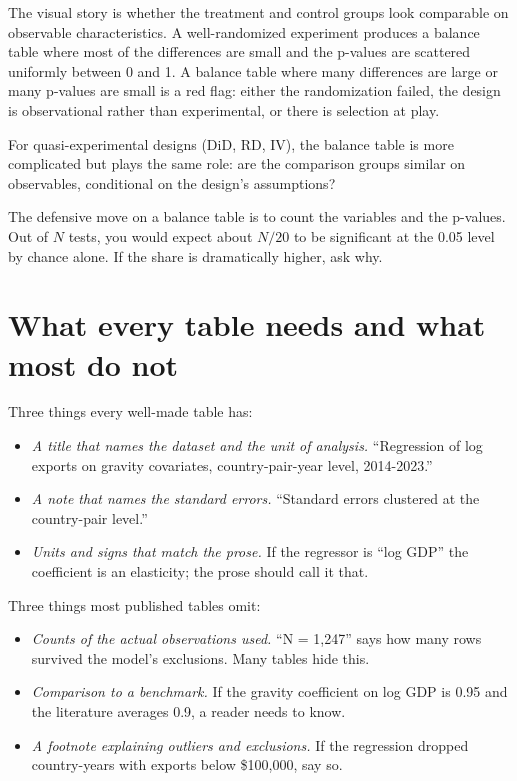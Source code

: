 \documentclass[
  letterpaper,
  11pt,
  twoside,
  openany]{scrbook}
\providecommand{\tightlist}{%
  \setlength{\itemsep}{0pt}\setlength{\parskip}{0pt}}
\begin{document}
The visual story is whether the treatment and control groups look
comparable on observable characteristics. A well-randomized experiment
produces a balance table where most of the differences are small and the
p-values are scattered uniformly between 0 and 1. A balance table where
many differences are large or many p-values are small is a red flag:
either the randomization failed, the design is observational rather than
experimental, or there is selection at play.

For quasi-experimental designs (DiD, RD, IV), the balance table is more
complicated but plays the same role: are the comparison groups similar
on observables, conditional on the design's assumptions?

The defensive move on a balance table is to count the variables and the
p-values. Out of \(N\) tests, you would expect about \(N/20\) to be
significant at the 0.05 level by chance alone. If the share is
dramatically higher, ask why.

\section{What every table needs and what most do
not}\label{what-every-table-needs-and-what-most-do-not}

Three things every well-made table has:

\begin{itemize}
\tightlist
\item
  \emph{A title that names the dataset and the unit of analysis.}
  ``Regression of log exports on gravity covariates, country-pair-year
  level, 2014-2023.''
\item
  \emph{A note that names the standard errors.} ``Standard errors
  clustered at the country-pair level.''
\item
  \emph{Units and signs that match the prose.} If the regressor is ``log
  GDP'' the coefficient is an elasticity; the prose should call it that.
\end{itemize}

Three things most published tables omit:

\begin{itemize}
\tightlist
\item
  \emph{Counts of the actual observations used.} ``N = 1,247'' says how
  many rows survived the model's exclusions. Many tables hide this.
\item
  \emph{Comparison to a benchmark.} If the gravity coefficient on log
  GDP is 0.95 and the literature averages 0.9, a reader needs to know.
\item
  \emph{A footnote explaining outliers and exclusions.} If the
  regression dropped country-years with exports below \$100,000, say so.
\end{itemize}
\end{document}
